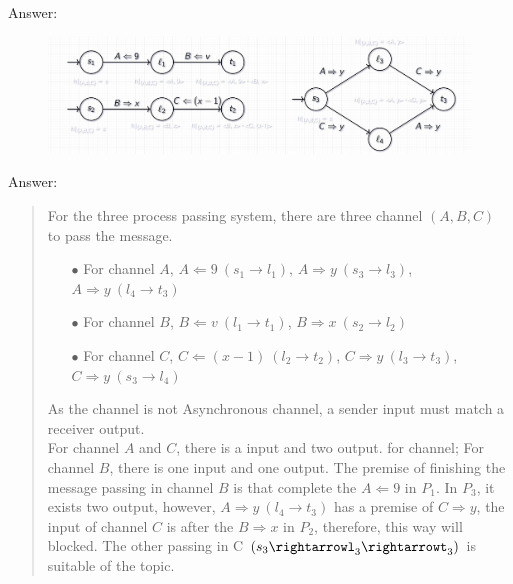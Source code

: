 \documentclass{article}
\begin{document}
\begin{Question} 
\begin{answer}
    Answer:
    \begin{figure}[H]
        \centering 
        \includegraphics[width=\textwidth]{DV_demand3}
    \end{figure}
\end{answer}
\clearpage
\begin{answer}
    Answer:
    \begin{quote}
        For the three process passing system, there are three channel $(A, B, C)$ to pass the message.
            \begin{itemize}
                \item [$\bullet$] For channel $A$, $A \Leftarrow  9\ (s_1 \rightarrow l_1)$, $A \Rightarrow y\ (s_3 \rightarrow l_3)$, $A \Rightarrow y\ (l_4 \rightarrow t_3)$
                \item [$\bullet$] For channel $B$, $B \Leftarrow v\ (l_1 \rightarrow t_1)$, $B \Rightarrow x\ (s_2 \rightarrow l_2)$
                \item [$\bullet$] For channel $C$, $C \Leftarrow (x-1)\ (l_2 \rightarrow t_2)$, $C \Rightarrow y\ (l_3 \rightarrow t_3)$, $C \Rightarrow y\ (s_3 \rightarrow l_4)$
            \end{itemize}
        As the channel is not Asynchronous channel, a sender input must match a receiver output. \\
        For channel $A$ and $C$, there is a input and two output. for channel; For channel $B$, there is one input and one output. The premise of finishing the message passing in channel $B$ is that complete the $A \Leftarrow 9$ in $P_1$. In $P_3$, it exists two output, however, $A \Rightarrow y\ (l_4 \rightarrow t_3)$ has a premise of $C \Rightarrow y$, the input of channel $C$ is after the $B \Rightarrow x$ in $P_2$, therefore, this way will blocked. The other passing in C $(s_3\rightarrowl_3\rightarrowt_3)$ is suitable of the topic.\\
    \end{quote}


\end{answer}
\end{Question}
\end{document}
